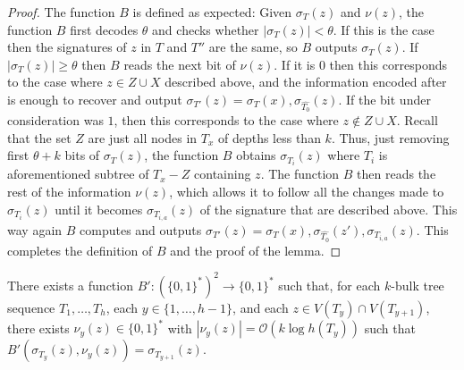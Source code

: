 \documentclass[kpfonts]{patmorin}
\newcommand{\snote}[1]{\fcolorbox{red}{yellow}{#1}}
\newcommand{\Oh}{\mathcal{O}}
\let\geq\geqslant
\begin{document}
\begin{proof}
  The function $B$ is defined as expected:
  Given $\sigma_{T}(z)$ and $\nu(z)$, the function $B$ first decodes $\theta$ and checks whether $|\sigma_{T}(z)| < \theta$. If this is the case then the signatures of $z$ in $T$ and $T''$ are the same, so $B$ outputs $\sigma_{T}(z)$.
  If $|\sigma_{T}(z)| \geq \theta$ then $B$ reads the next bit of $\nu(z)$. 
  If it is $0$ then this corresponds to the case where $z\in Z\cup X$ described above, and the information encoded after is enough to recover and output $\sigma_{T'}(z)=\sigma_{T}(x),\sigma_{\hat{T_0}}(z)$.
  If the bit under consideration was $1$, then this corresponds to the case where $z\not\in Z\cup X$. 
  Recall that the set $Z$ are just all nodes in $T_x$ of depths less than $k$. 
  Thus, just removing first $\theta+k$ bits of $\sigma_{T}(z)$, the function $B$ obtains $\sigma_{T_i}(z)$ where $T_i$ is aforementioned subtree of $T_x-Z$ containing $z$.
  The function $B$ then reads the rest of the information $\nu(z)$, 
  which allows it to follow all the changes made to $\sigma_{T_i}(z)$ until it becomes $\sigma_{T_{i,a}}(z)$ of the signature that are described above. 
  This way again $B$ computes and outputs $\sigma_{T'}(z) = \sigma_{T}(x),\sigma_{\hat{T_0}}(z'),\sigma_{T_{i,a}}(z)$.
  This completes the definition of $B$ and the proof of the lemma.
\end{proof}

\begin{lem}
  There exists a function $B':(\{0,1\}^*)^2\to\{0,1\}^*$ such that, for each $k$-bulk tree sequence $T_1,\dots,T_h$, each $y\in\{1,\dots,h-1\}$, and each $z\in V(T_y)\cap V(T_{y+1})$, there exists $\nu_y(z)\in\{0,1\}^*$ with $|\nu_y(z)| = \Oh(k\log h(T_y))$ such that $B'(\sigma_{T_y}(z), \nu_y(z)) = \sigma_{T_{y+1}}(z)$.
\end{lem}


\end{document}
